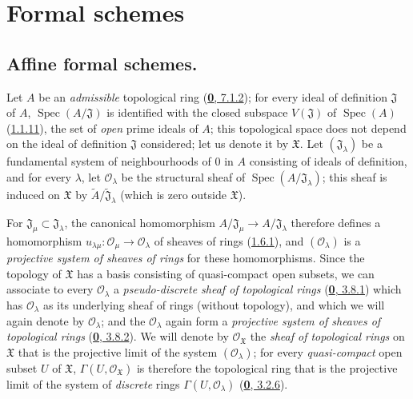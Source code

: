 \section{Formal schemes}
\label{section:I.10}

\subsection{Affine formal schemes.}
\label{subsection:I.10.1}

\begin{env}[10.1.1]
\label{I.10.1.1}
Let $A$ be an \emph{admissible} topological ring
(\hyperref[0.7.1.2]{\textbf{0}, 7.1.2}); for every ideal of definition
$\mathfrak{J}$ of $A$, $\operatorname{Spec}(A/\mathfrak{J})$ is identified
with the closed subspace $V(\mathfrak{J})$ of $\operatorname{Spec}(A)$
(\hyperref[I.1.1.11]{1.1.11}), the set of \emph{open} prime ideals
of $A$; this topological space does not depend on
the ideal of definition $\mathfrak{J}$ considered; let us denote it by
$\mathfrak{X}$. Let $(\mathfrak{J}_\lambda)$ be a fundamental system of
neighbourhoods of 0 in $A$ consisting of ideals of definition, and for every
$\lambda$, let $\mathscr{O}_\lambda$ be the structural sheaf of
$\operatorname{Spec}(A/\mathfrak{J}_\lambda)$; this sheaf is induced on
$\mathfrak{X}$ by
$\widetilde{A}/\widetilde{\mathfrak{J}}_\lambda$ (which is zero outside
$\mathfrak{X}$).

For $\mathfrak{J}_\mu\subset\mathfrak{J}_\lambda$, the canonical
homomorphism $A/\mathfrak{J}_\mu\to A/\mathfrak{J}_\lambda$ therefore
defines a homomorphism
$u_{\lambda\mu}:\mathscr{O}_\mu\to\mathscr{O}_\lambda$ of sheaves of
rings (\hyperref[I.1.6.1]{1.6.1}), and
$(\mathscr{O}_\lambda)$ is a \emph{projective system of sheaves of
rings} for these homomorphisms. Since the topology of $\mathfrak{X}$
has a basis consisting of quasi-compact open subsets, we can associate to
every $\mathscr{O}_\lambda$ a \emph{pseudo-discrete sheaf of topological
rings} (\hyperref[0.3.8.1]{\textbf{0}, 3.8.1}) which has
$\mathscr{O}_\lambda$ as its underlying sheaf of rings (without topology),
and which we will again denote by $\mathscr{O}_\lambda$; and the
$\mathscr{O}_\lambda$ again form a \emph{projective system of sheaves of
topological rings} (\hyperref[0.3.8.2]{\textbf{0}, 3.8.2}). We will denote
by $\mathscr{O}_{\mathfrak{X}}$ the \emph{sheaf of topological rings}
on $\mathfrak{X}$ that is the projective limit of the system
$(\mathscr{O}_\lambda)$; for every \emph{quasi-compact} open subset $U$ of
$\mathfrak{X}$, $\Gamma(U,\mathscr{O}_{\mathfrak{X}})$ is therefore the
topological ring that is the projective limit of the system of
\emph{discrete} rings $\Gamma(U,\mathscr{O}_\lambda)$
(\hyperref[0.3.2.6]{\textbf{0}, 3.2.6}).
\end{env}


